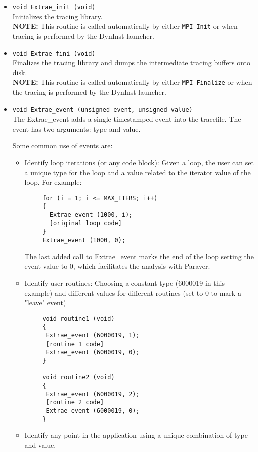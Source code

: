 \begin{itemize}

 \item {\tt void Extrae\_init (void)}\\
 Initializes the tracing library.\\
 {\bf NOTE:} This routine is called automatically by either {\tt MPI\_Init} or when tracing is performed by the DynInst launcher.

 \item {\tt void Extrae\_fini (void)}\\
 Finalizes the tracing library and dumps the intermediate tracing buffers onto disk.\\
 {\bf NOTE:} This routine is called automatically by either {\tt MPI\_Finalize} or when the tracing is performed by the DynInst launcher.

 \item {\tt void Extrae\_event (unsigned event, unsigned value)}\\
 The Extrae\_event adds a single timestamped event into the tracefile. The event has two arguments: type and value.

 Some common use of events are:
  \begin{itemize}
   \item Identify loop iterations (or any code block): Given a loop, the user can set a unique type for the loop and a value related to the iterator value of the loop. For example:
    \begin{verbatim}
     for (i = 1; i <= MAX_ITERS; i++)
     {
       Extrae_event (1000, i);
       [original loop code]
     }
     Extrae_event (1000, 0);
    \end{verbatim}
   The last added call to Extrae\_event marks the end of the loop setting the event value to 0, which facilitates the analysis with Paraver.
   \item Identify user routines: Choosing a constant type (6000019 in this example) and different values for different routines (set to 0 to mark a "leave" event) 
    \begin{verbatim}
     void routine1 (void)
     {
      Extrae_event (6000019, 1);
      [routine 1 code]
      Extrae_event (6000019, 0);
     }

     void routine2 (void)
     {
      Extrae_event (6000019, 2);
      [routine 2 code]
      Extrae_event (6000019, 0);
     }
   \end{verbatim}
   \item Identify any point in the application using a unique combination of type and value.
  \end{itemize}


\end{itemize}
